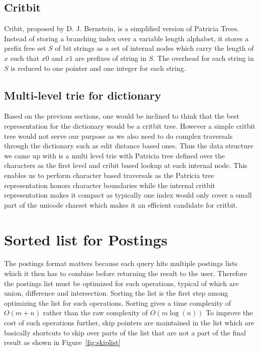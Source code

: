 \subsection{Critbit}
Cribit, proposed by D. J. Bernstein\cite{bernsteinCritbit}, is a simplified version of Patricia Trees.
Instead of storing a branching index over a variable length alphabet, it stores a prefix free set $S$ of bit strings
as a set of internal nodes which carry the length of $x$ such that $x0$ and $x1$ are prefixes of string in $S$.
The overhead for each string in $S$ is reduced to one pointer and one integer for each string.

\subsection{Multi-level trie for dictionary}
Based on the previous sections, one would be inclined to think that the best representation for the dictionary would be a critbit tree.
However a simple critbit tree would not serve our purpose as we also need to do complex traversals through the dictionary such as edit distance based ones.
Thus the data structure we came up with is a multi level trie with Patricia tree defined over the characters as the first level
and cribit based lookup at each internal node.
This enables us to perform character based traversals as the Patricia tree representation honors character boundaries
while the internal critbit representation makes it compact as typically one index would only cover a small part of the unicode charset which makes it
an efficient candidate for critbit.

\section{Sorted list for Postings}
The postings format matters because each query hits multiple postings lists which it then has to combine before returning the result to the user.
Therefore the postings list must be optimized for such operations, typical of which are union, difference and intersection.
Sorting the list is the first step among optimizing the list for such operations.
Sorting gives a time complexity of $O(m+n)$ rather than the raw complexity of $O(m \log(n))$
To improve the cost of such operations further, skip pointers are maintained in the list which are basically shortcuts to skip over parts of the list
that are not a part of the final result as shown in Figure~\ref{fig:skiplist}

